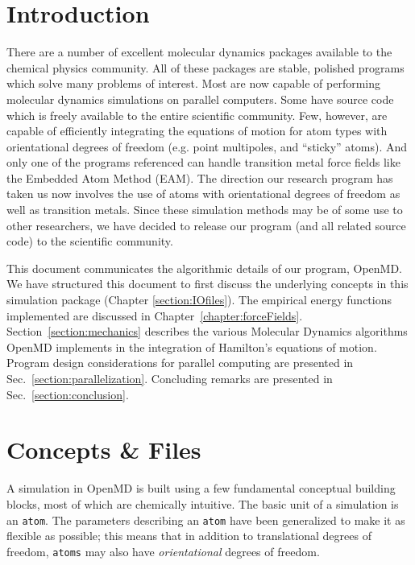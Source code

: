 \documentclass[letterpaper]{report}
\begin{document}
\tableofcontents


\chapter{\label{sec:intro}Introduction}

There are a number of excellent molecular dynamics packages available
to the chemical physics
community.\cite{Brooks83,MacKerell98,pearlman:1995,Gromacs,Gromacs3,DL_POLY,Tinker,Paradyn,namd,macromodel}
All of these packages are stable, polished programs which solve many
problems of interest.  Most are now capable of performing molecular
dynamics simulations on parallel computers.  Some have source code
which is freely available to the entire scientific community.  Few,
however, are capable of efficiently integrating the equations of
motion for atom types with orientational degrees of freedom
(e.g. point multipoles, and ``sticky'' atoms).  And only one of the
programs referenced can handle transition metal force fields like the
Embedded Atom Method (EAM).  The direction our research program
has taken us now involves the use of atoms with orientational degrees
of freedom as well as transition metals.  Since these simulation
methods may be of some use to other researchers, we have decided to
release our program (and all related source code) to the scientific
community.

This document communicates the algorithmic details of our program,
OpenMD.  We have structured this document to first discuss the
underlying concepts in this simulation package (Chapter
\ref{section:IOfiles}).  The empirical energy functions implemented
are discussed in Chapter~\ref{chapter:forceFields}.
Section~\ref{section:mechanics} describes the various Molecular Dynamics
algorithms OpenMD implements in the integration of Hamilton's
equations of motion.  Program design considerations for parallel
computing are presented in Sec.~\ref{section:parallelization}.
Concluding remarks are presented in Sec.~\ref{section:conclusion}.

\chapter{\label{section:IOfiles}Concepts \& Files}

A simulation in OpenMD is built using a few fundamental
conceptual building blocks, most of which are chemically intuitive.
The basic unit of a simulation is an {\tt atom}.  The parameters
describing an {\tt atom} have been generalized to make it as flexible
as possible; this means that in addition to translational degrees of
freedom, {\tt atoms} may also have {\it orientational} degrees of
freedom.
\end{document}
